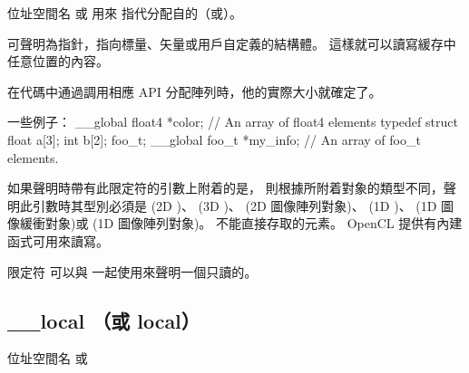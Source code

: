 位址空間名  或  用來
指代分配自的（或）。

 可聲明為指針，指向標量、矢量或用戶自定義的結構體。
這樣就可以讀寫緩存中任意位置的內容。

在代碼中通過調用相應 API 分配陣列時，他的實際大小就確定了。

一些例子：
\startclc
__global float4	*color;	// An array of float4 elements
typedef struct {
	float	a[3];
	int	b[2];
} foo_t;
__global foo_t	*my_info;	// An array of foo_t elements.
\stopclc

如果聲明時帶有此限定符的引數上附着的是，
則根據所附着對象的類型不同，聲明此引數時其型別必須是
  (2D )、  (3D )、
  (2D 圖像陣列對象)、  (1D )、
  (1D 圖像緩衝對象)或  (1D 圖像陣列對象)。
不能直接存取的元素。 OpenCL 提供有內建函式可用來讀寫。

限定符  可以與  一起使用來聲明一個只讀的。

\subsection{__local （或 local）}

位址空間名  或  